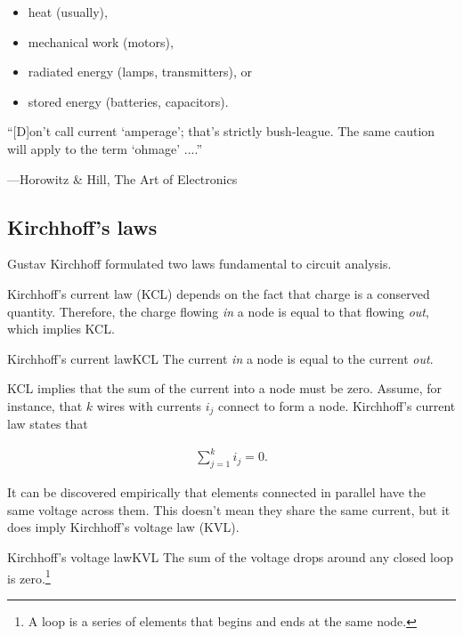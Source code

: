\documentclass[electronics.tex]{subfiles}
\begin{document}
\begin{itemize}
  \item heat (usually),
  \item mechanical work (motors),
  \item radiated energy (lamps, transmitters), or
  \item stored energy (batteries, capacitors).
\end{itemize}

\begin{infobox}
  ``[D]on't call current `amperage'; that's strictly bush-league. The same caution will apply to the term `ohmage' ....''\\
  {\raggedleft---Horowitz \& Hill, The Art of Electronics\par}
\end{infobox}

\subsection{Kirchhoff's laws}
\tags{}

Gustav Kirchhoff formulated two laws fundamental to circuit analysis.
\tags{}

Kirchhoff's current law (KCL) depends on the fact that charge is a conserved quantity. Therefore, the charge flowing \emph{in} a node is equal to that flowing \emph{out}, which implies KCL.

\begin{Definition}{Kirchhoff's current law}{KCL}
  The current \emph{in} a node is equal to the current \emph{out}.
\end{Definition}

KCL implies that the sum of the current into a node must be zero.
Assume, for instance, that $k$ wires with currents $i_j$ connect to form a node.
Kirchhoff's current law states that

\begin{align}
  \sum_{j=1}^k i_j = 0.
\end{align}

It can be discovered empirically that elements connected in parallel have the same voltage across them.
This doesn't mean they share the same current, but it does imply Kirchhoff's voltage law (KVL).

\begin{Definition}{Kirchhoff's voltage law}{KVL}
  The sum of the voltage drops around any closed loop is zero.\footnote{A loop is a series of elements that begins and ends at the same node.}
\end{Definition}
\end{document}
